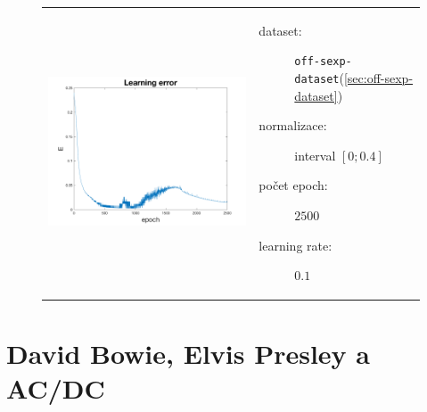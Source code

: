 \documentclass[thesis=M,czech]{FITthesis}[2012/06/26]
\begin{document}
\begin{figure}[htbp]
\begin{tabular}{p{}p{}}
    \begin{minipage}{.5\textwidth}
    \centering
    \includegraphics[scale=0.3]{err_sexp-ram.png}
    \label{fig:fig1}
    \end{minipage}
    &
    \begin{minipage}{.5\textwidth}
		\begin{description}
            \item[dataset:] \texttt{off-sexp-dataset}(\ref{sec:off-sexp-dataset})
            \item[normalizace:] interval $[0;0.4]$
            \item[počet epoch:] $2500$
            \item[learning rate:] $0.1$
        \end{description}
\end{minipage}
\end{tabular}
\end{figure}




\section{David Bowie, Elvis Presley a AC/DC}\label{exp:db-ep-acdc}
\end{document}

